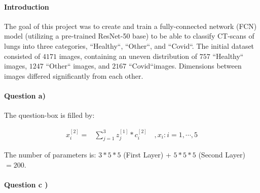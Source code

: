 \documentclass[11pt]{article}
\begin{document}
\MakeScribeTop


\paragraph{\noindent\textbf{\LARGE{Introduction}}}
\begin{flushleft}
    The goal of this project was to create and train a fully-connected network (FCN) 
    model (utilizing a pre-trained ResNet-50 base) to be able to classify CT-scans 
    of lungs into three categories, ``Healthy``, ``Other``, and ``Covid``. 
    \newline
    \newline
    The initial dataset consisted of $4171$ images, containing an uneven distribution
    of $757$ ``Healthy`` images, $1247$ ``Other`` images, and $2167$ ``Covid``images. 
    Dimensions between images differed significantly from each other.
\end{flushleft} 

\paragraph{\noindent\textbf{\LARGE{Question a)}}}
\begin{flushleft}
    The question-box is filled by:
\end{flushleft} 
\begin{equation*}
\begin{split}
    x_i^{[2]} = & \sum_{j=1}^3 z_j^{[1]} * c_i^{[2]} \quad , x_i : i = 1, \cdots, 5
\end{split}
\end{equation*}
\begin{flushleft}
    The number of parameters is: $3*5*5$ (First Layer) + $5*5*5$ (Second Layer) $=200$.
\end{flushleft} 


\paragraph{\noindent\textbf{\LARGE{Question c )}}}
\end{document}
